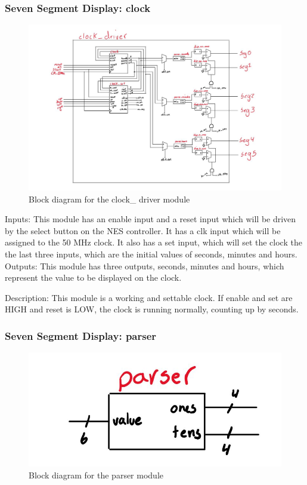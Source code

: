 \documentclass[a4paper]{article}
\begin{document}
\subsubsection{Seven Segment Display: clock}
\begin{figure}[H]
    \includegraphics[width=0.8 \linewidth]{images/clockdriver.JPG}
    \caption{Block diagram for the clock\_ driver module}
    \label{clockdriver}
\end{figure}

Inputs: This module has an enable input and a reset input which will be driven by the select button on the NES controller. It has a clk input which will be assigned to the 50 MHz clock. It also has a set input, which will set the clock the the last three inputs, which are the initial values of seconds, minutes and hours.
Outputs: This module has three outputs, seconds, minutes and hours, which represent the value to be displayed on the clock.

Description: This module is a working and settable clock. If enable and set are HIGH and reset is LOW, the clock is running normally, counting up by seconds.

\subsubsection{Seven Segment Display: parser}
\begin{figure}[H]
    \includegraphics[width=0.8 \linewidth]{images/parser.JPG}
    \caption{Block diagram for the parser module}
    \label{parser}
\end{figure}
\end{document}
